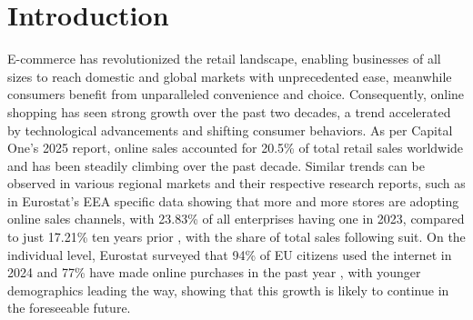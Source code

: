 \documentclass{imc-inf}
\begin{document}
\mainmatter
\chapter{Introduction}
\label{ch:introduction}

E-commerce has revolutionized the retail landscape, enabling businesses of all sizes to reach domestic and global markets with unprecedented ease, meanwhile consumers benefit from unparalleled convenience and choice.
Consequently, online shopping has seen strong growth over the past two decades, a trend accelerated by technological advancements and shifting consumer behaviors. As per Capital One's 2025 report, online sales accounted for 20.5\% of total retail sales worldwide \cite{capitaloneECommerceStatistics20252025} and has been steadily climbing over the past decade.
Similar trends can be observed in various regional markets and their respective research reports, such as in Eurostat's EEA specific data  showing that more and more stores are adopting online sales channels, with 23.83\% of all enterprises having one in 2023, compared to just 17.21\% ten years prior \cite{eurostatEcommerceStatistics2025}, with the share of total sales following suit.
On the individual level, Eurostat surveyed that 94\% of EU citizens used the internet in 2024 and 77\% have made online purchases in the past year \cite{eurostatEcommerceStatisticsIndividuals2025}, with younger demographics leading the way, showing that this growth is likely to continue in the foreseeable future.
\end{document}
